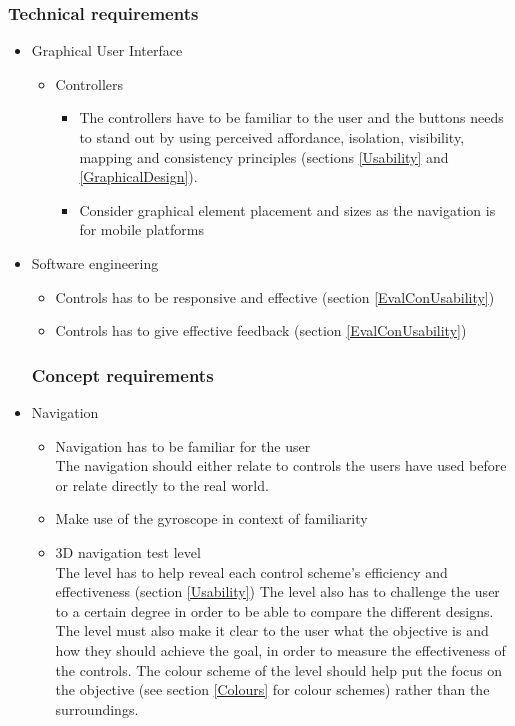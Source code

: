 \subsubsection{Technical requirements}
\begin{itemize}
	\item Graphical User Interface
		\begin{itemize}
		\item Controllers
			\begin{itemize}
				\item The controllers have to be familiar to the user and the buttons needs to stand out by using perceived affordance, isolation, visibility, mapping and consistency principles (sections \ref{Usability} and \ref{GraphicalDesign}).  
				\item Consider graphical element placement and sizes as the navigation is for mobile platforms
			\end{itemize}
		\end{itemize}
	\item Software engineering
		\begin{itemize}
			\item Controls has to be responsive and effective (section \ref{EvalConUsability})
			\item Controls has to give effective feedback (section \ref{EvalConUsability})
		\end{itemize}	
\subsubsection{Concept requirements}
	\item Navigation
		\begin{itemize}
		 	\item Navigation has to be familiar for the user \\
The navigation should either relate to controls the users have used before or relate directly to the real world.	
		 	\item Make use of the gyroscope in context of familiarity
		 	\item 3D navigation test level\\
The level has to help reveal each control scheme's efficiency and effectiveness (section \ref{Usability})
The level also has to challenge the user to a certain 	degree in order to be able to compare the different designs. The level must also make it clear to the user what the objective is and how they should achieve the goal, in order to measure the effectiveness of the controls. The colour scheme of the level should help put the focus on the objective (see section \ref{Colours} for colour schemes) rather than the surroundings.
				\end{itemize}
\end{itemize}